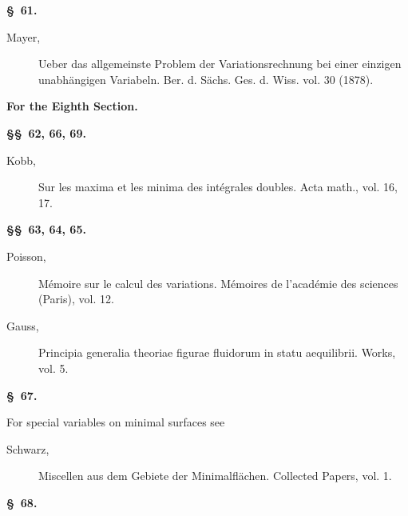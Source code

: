 \documentclass[11pt,a4paper,leqno]{article}
\begin{document}
\begin{center}{\bfseries \S~61.}\end{center}

\begin{description}
\item[Mayer,] Ueber das allgemeinste Problem der Variationsrechnung bei einer
einzigen unabhängigen Variabeln. Ber. d. Sächs. Ges. d. Wiss. vol. 30 (1878).
\end{description}

\begin{center}
{\large\bfseries For the Eighth Section.}

{\bfseries \S\S~62, 66, 69.}
\end{center}

\begin{description}
\item[Kobb,] Sur les maxima et les minima des intégrales doubles. Acta math.,
vol. 16, 17.
\end{description}

\begin{center}{\bfseries \S\S~63, 64, 65.}\end{center}

\begin{description}
\item[Poisson,] Mémoire sur le calcul des variations. Mémoires de l'académie des
sciences (Paris), vol. 12.

\item[Gauss,] Principia generalia theoriae figurae fluidorum in statu
aequilibrii. Works, vol. 5.
\end{description}

\begin{center}{\bfseries \S~67.}\end{center}

\noindent For special variables on minimal surfaces see

\begin{description}
\item[Schwarz,] Miscellen aus dem Gebiete der Minimalflächen. Collected Papers,
vol. 1.
\end{description}

\begin{center}{\bfseries \S~68.}\end{center}
\end{document}
